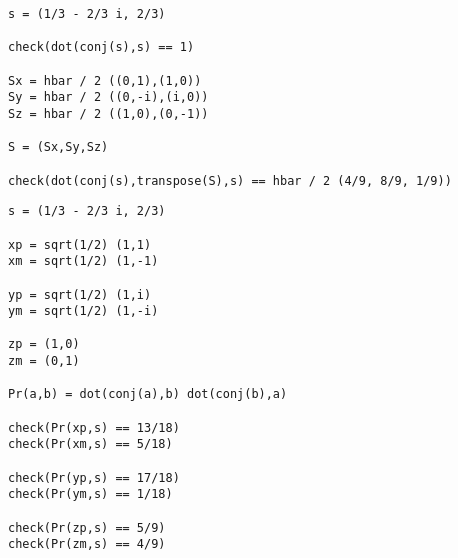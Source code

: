 {\footnotesize\begin{verbatim}
s = (1/3 - 2/3 i, 2/3)

check(dot(conj(s),s) == 1)

Sx = hbar / 2 ((0,1),(1,0))
Sy = hbar / 2 ((0,-i),(i,0))
Sz = hbar / 2 ((1,0),(0,-1))

S = (Sx,Sy,Sz)

check(dot(conj(s),transpose(S),s) == hbar / 2 (4/9, 8/9, 1/9))
\end{verbatim}}


{\footnotesize\begin{verbatim}
s = (1/3 - 2/3 i, 2/3)

xp = sqrt(1/2) (1,1)
xm = sqrt(1/2) (1,-1)

yp = sqrt(1/2) (1,i)
ym = sqrt(1/2) (1,-i)

zp = (1,0)
zm = (0,1)

Pr(a,b) = dot(conj(a),b) dot(conj(b),a)

check(Pr(xp,s) == 13/18)
check(Pr(xm,s) == 5/18)

check(Pr(yp,s) == 17/18)
check(Pr(ym,s) == 1/18)

check(Pr(zp,s) == 5/9)
check(Pr(zm,s) == 4/9)
\end{verbatim}}

